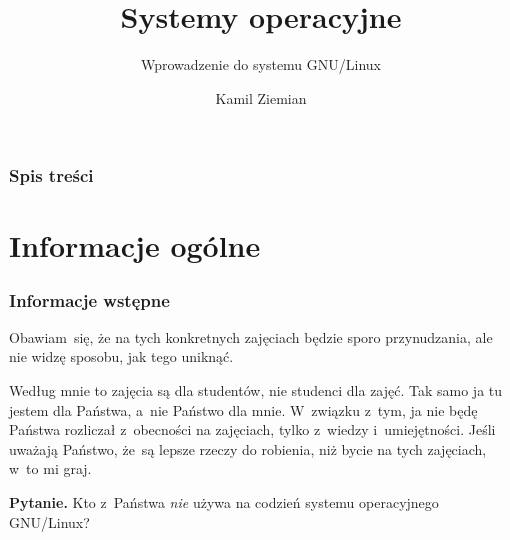 \documentclass[10pt,t]{beamer}
\title{Systemy operacyjne}
\subtitle{Wprowadzenie do systemu GNU/Linux}
\author{Kamil Ziemian}
\begin{document}





\RaggedRight





\maketitle





\begin{frame}
  \frametitle{Spis treści}


  \tableofcontents

\end{frame}





\section{Informacje ogólne}



\begin{frame}
  \frametitle{Informacje wstępne}


  Obawiam~się, że na tych konkretnych zajęciach będzie sporo przynudzania,
  ale nie widzę sposobu, jak tego uniknąć.

  Według mnie to zajęcia są dla studentów, nie studenci dla zajęć. Tak samo
  ja tu jestem dla Państwa, a~nie Państwo dla mnie. W~związku z~tym, ja nie
  będę Państwa rozliczał z~obecności na zajęciach, tylko z~wiedzy
  i~umiejętności. Jeśli uważają Państwo, że~są lepsze rzeczy do robienia,
  niż bycie na tych zajęciach, w~to mi graj.

  \textbf{Pytanie.} Kto z~Państwa \textit{nie} używa na codzień systemu
  operacyjnego GNU/Linux?

\end{frame}
\end{document}
